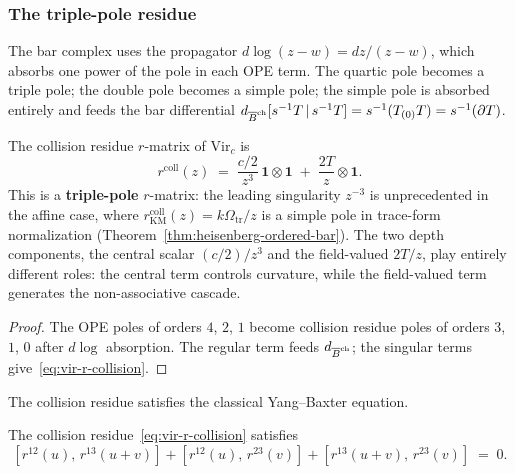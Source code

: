 \subsubsection*{The triple-pole residue}

The bar complex uses the propagator $d\log(z-w) = dz/(z-w)$, which
absorbs one power of the pole in each OPE term. The quartic
pole becomes a triple pole; the double pole becomes a simple pole; the
simple pole is absorbed entirely and feeds the bar differential
$d_{\overline{B}^{\mathrm{ch}}}[s^{-1}T \,|\, s^{-1}T]
= s^{-1}(T_{(0)}T) = s^{-1}(\partial T)$.

\begin{proposition}
\label{prop:vir-collision-residue}
The collision residue $r$-matrix of\/ $\mathrm{Vir}_c$ is
\begin{equation}\label{eq:vir-r-collision}
r^{\mathrm{coll}}(z)
\;=\;
\frac{c/2}{z^3}\,\mathbf{1}\otimes\mathbf{1}
\;+\;
\frac{2T}{z}\otimes\mathbf{1}.
\end{equation}
This is a \textbf{triple-pole} $r$-matrix: the leading singularity
$z^{-3}$ is unprecedented in the affine case, where
$r^{\mathrm{coll}}_{\mathrm{KM}}(z)=k\Omega_{\mathrm{tr}}/z$ is a
simple pole in trace-form normalization
\textup{(}Theorem~\textup{\ref{thm:heisenberg-ordered-bar})}.
The two depth components, the central scalar
$(c/2)/z^3$ and the field-valued $2T/z$, play entirely different
roles: the central term controls curvature, while the field-valued
term generates the non-associative cascade.
\end{proposition}

\begin{proof}
The OPE poles of orders $4$, $2$, $1$ become collision residue poles
of orders $3$, $1$, $0$ after $d\log$ absorption. The regular term
feeds $d_{\overline{B}^{\mathrm{ch}}}$; the singular terms
give~\eqref{eq:vir-r-collision}.
\end{proof}

The collision residue satisfies the classical Yang--Baxter equation.

\begin{proposition}
\label{prop:vir-CYBE-ordered}
The collision residue~\eqref{eq:vir-r-collision} satisfies
\begin{equation}\label{eq:vir-CYBE-ordered}
[r^{12}(u),\, r^{13}(u+v)]
+ [r^{12}(u),\, r^{23}(v)]
+ [r^{13}(u+v),\, r^{23}(v)]
\;=\; 0.
\end{equation}
\end{proposition}

